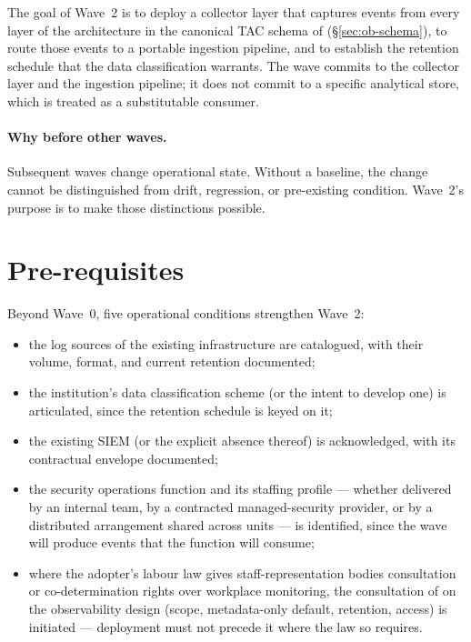 The goal of Wave~2 is to deploy a collector layer that captures
events from every layer of the architecture in the canonical TAC
schema of  (\S\ref{sec:ob-schema}), to
route those events to a portable ingestion pipeline, and to
establish the retention schedule that the data classification
warrants. The wave commits to the collector layer and the
ingestion pipeline; it does not commit to a specific analytical
store, which is treated as a substitutable consumer.

\paragraph{Why before other waves.} Subsequent waves change
operational state. Without a baseline, the change cannot be
distinguished from drift, regression, or pre-existing condition.
Wave~2's purpose is to make those distinctions possible.

\section{Pre-requisites}
\label{sec:w2-prereq}

Beyond Wave~0, five operational conditions strengthen Wave~2:

\begin{itemize}[leftmargin=1.5em,nosep]
  \item the log sources of the existing infrastructure are
    catalogued, with their volume, format, and current retention
    documented;
  \item the institution's data classification scheme (or the
    intent to develop one) is articulated, since the retention
    schedule is keyed on it;
  \item the existing SIEM (or the explicit absence thereof) is
    acknowledged, with its contractual envelope documented;
  \item the security operations function and its staffing profile
    --- whether delivered by an internal team, by a contracted
    managed-security provider, or by a distributed arrangement
    shared across units --- is identified, since the wave will
    produce events that the function will consume;
  \item where the adopter's labour law gives staff-representation
    bodies consultation or co-determination rights over workplace
    monitoring, the consultation of 
    on the observability design (scope, metadata-only default,
    retention, access) is initiated --- deployment must not precede
    it where the law so requires.
\end{itemize}


